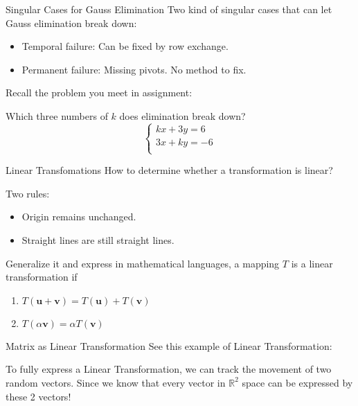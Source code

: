 \documentclass{beamer}
\begin{document}
\begin{frame}{Singular Cases for Gauss Elimination}
Two kind of singular cases that can let Gauss elimination break down:
\begin{itemize}
    \item Temporal failure: Can be fixed by row exchange.
    \item Permanent failure: Missing pivots. No method to fix.
\end{itemize}

Recall the problem you meet in assignment:

Which three numbers of $k$ does elimination break down?
\begin{equation*}
    \begin{cases}
        kx+3y=6\\
        3x+ky=-6\\
    \end{cases}
\end{equation*}

\end{frame}




\begin{frame}{Linear Transfomations}
How to determine whether a transformation is linear?

\vspace{5pt}
Two rules:
\begin{itemize}
    \item Origin remains unchanged.
    \item Straight lines are still straight lines.
\end{itemize}

Generalize it and express in mathematical languages, a mapping $T$ is a linear transformation if
\begin{enumerate}
    \item $T\left( \mathbf{u}+\mathbf{v} \right) =T\left( \mathbf{u} \right) +T\left( \mathbf{v} \right)$
    \item $T\left( \alpha \mathbf{v} \right) =\alpha T\left( \mathbf{v} \right) $
\end{enumerate}
\end{frame}

\begin{frame}{Matrix as Linear Transformation}
See this example of Linear Transformation:


To fully express a Linear Transformation, we can track the movement of two random vectors. Since we know that every vector in $\mathbb{R}^2$ space can be expressed by these 2 vectors!
\end{frame}
\end{document}
